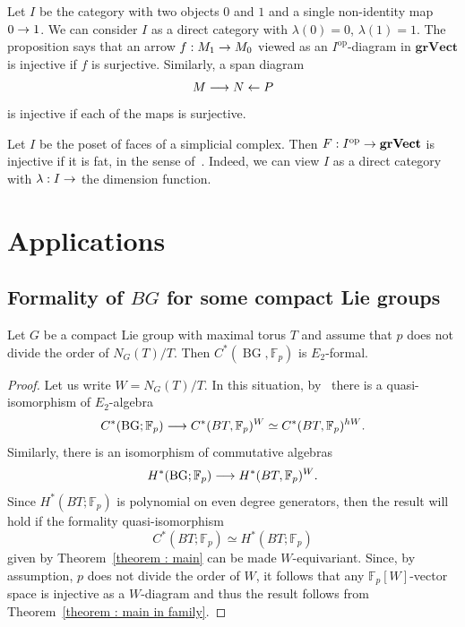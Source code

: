 \documentclass[AHL,Unicode,longabstracts,published]{cedram}
\DeclareMathOperator{\opp}{op}
\DeclareMathOperator{\BG}{BG}
\newcommand{\grVect}{\mathbf{grVect}}
\newcommand{\FF}{\mathbb{F}}
\renewcommand*{\to}{\mathchoice{\longrightarrow}{\rightarrow}{\rightarrow}{\rightarrow}}
\newcommand{\FF}{\mathbb{F}}
\begin{document}
\begin{exam}\label{remark : injective 1}
Let $I$ be the category with two objects $0$ and $1$ and a single non-identity map $0\to 1$. We can consider $I$ as a direct category with $\lambda(0)=0$, $\lambda(1)=1$. The proposition says that an arrow $f: M_1\to M_0$ viewed as an $I^{\opp}$-diagram in $\grVect$ is injective if $f$ is surjective. Similarly, a span diagram
\[
M\to N\leftarrow P
\]
is injective if each of the maps is surjective.
\end{exam}

\begin{exam}\label{remark : injective 2}
Let $I$ be the poset of faces of a simplicial complex. Then $F: I^{\opp}\linebreak\to\grVect$ is injective if it is fat, in the sense of~\cite[Definition~3.6]{notbohmray}. Indeed, we can view $I$ as a direct category with $\lambda: I\to$ the dimension function.
\end{exam}

\section{Applications}

\subsection{Formality of \texorpdfstring{$BG$}{\BG} for some compact Lie groups}

\begin{theo}\label{theorem : formality compact Lie group}
Let $G$ be a compact Lie group with maximal torus $T$ and assume that $p$ does not divide the order of $N_G(T)/T$. Then $C^*(\BG,\FF_p)$ is $E_2$-formal.
\end{theo}

\begin{proof}
Let us write $W=N_G(T)/T$. In this situation, by~\cite[Theorem~1.5]{feshbach} there is a quasi-isomorphism of $E_2$-algebra
\[
C^*(\BG;\FF_p)\to C^*(BT,\FF_p)^W\simeq C^*(BT,\FF_p)^{hW}.
\]
Similarly, there is an isomorphism of commutative algebras
\[
H^*(\BG;\FF_p)\to H^*(BT,\FF_p)^W.
\]
Since $H^*(BT;\FF_p)$ is polynomial on even degree generators, then the result will hold if the formality quasi-isomorphism
\[
C^*(BT;\FF_p)\simeq H^*(BT;\FF_p)
\]
given by Theorem~\ref{theorem : main} can be made $W$-equivariant. Since, by assumption, $p$ does not divide the order of $W$, it follows that any $\FF_p[W]$-vector space is injective as a $W$-diagram and thus the result follows from Theorem~\ref{theorem : main in family}.
\end{proof}
\end{document}
